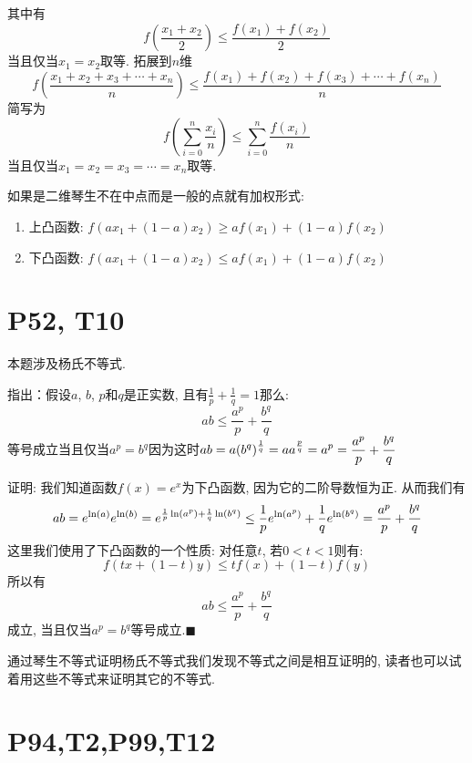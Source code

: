 \documentclass{book}
\begin{document}
    其中有$$f\left( \frac{x_1+x_2}{2} \right)\le \frac{f\left( x_1 \right)+f\left( x_2 \right)}{2}$$当且仅当$x_1=x_2$取等. 拓展到$n$维$$f\left( \frac{x_1+x_2+x_3+\cdots+x_n}{n} \right)\le \frac{f(x_1)+f(x_2)+f(x_3)+\cdots+f(x_n)}{n}$$简写为$$f\left( \sum_{i=0}^{n}\frac{x_i }{n} \right)\le \sum_{i=0}^{n}\frac{f(x_i) }{n}$$当且仅当$x_1=x_2=x_3=\cdots=x_n$取等.

    如果是二维琴生不在中点而是一般的点就有加权形式:
    \begin{enumerate}
        \item 上凸函数: $f\left( ax_1+\left( 1-a \right)x_2 \right)\ge af\left( x_1 \right)+(1-a)f\left( x_2 \right)$
        \item 下凸函数: $f\left( ax_1+\left( 1-a \right)x_2 \right)\le af\left( x_1 \right)+(1-a)f\left( x_2 \right)$
    \end{enumerate}

    \section{\textcolor[rgb]{0.11,0.65,0.52}{P52, T10}}

    本题涉及\textcolor[rgb]{0.38,0.11,0.2}{杨氏不等式}.\cite{Young}

    指出：假设${\displaystyle a}$, ${\displaystyle b}$, ${\displaystyle p}$和${\displaystyle q}$是正实数, 且有${\displaystyle {\frac {1}{p}}+{\frac {1}{q}}=1}$那么:$${\displaystyle ab\leq {\frac {a^{p}}{p}}+{\frac {b^{q}}{q}}}$$等号成立当且仅当${\displaystyle a^{p}=b^{q}}$因为这时${\displaystyle ab=a(b^{q})^{1 \over q}=aa^{p \over q}=a^{p}={a^{p} \over p}+{b^{q} \over q}}$

    证明: 我们知道函数${\displaystyle f(x)=e^{x}}$为下凸函数, 因为它的二阶导数恒为正. 从而我们有$${\displaystyle ab=e^{\ln(a)}e^{\ln(b)}=e^{{1 \over p}\ln(a^{p})+{1 \over q}\ln(b^{q})}\leq {1 \over p}e^{\ln(a^{p})}+{1 \over q}e^{\ln(b^{q})}={a^{p} \over p}+{b^{q} \over q}}$$这里我们使用了下凸函数的一个性质: 对任意$t$, 若${\displaystyle 0<t<1}$则有:$${\displaystyle f(tx+(1-t)y)\leq tf(x)+(1-t)f(y)}$$
    所以有$${\displaystyle ab\leq {\frac {a^{p}}{p}}+{\frac {b^{q}}{q}}}$$成立, 当且仅当${\displaystyle a^{p}=b^{q}}$等号成立.$\blacksquare$

    通过琴生不等式证明杨氏不等式我们发现不等式之间是相互证明的, 读者也可以试着用这些不等式来证明其它的不等式.

    \section{\textcolor[rgb]{0.11,0.65,0.52}{P94,T2,P99,T12}}
\end{document}
